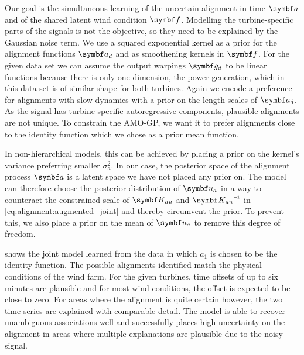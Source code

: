 Our goal is the simultaneous learning of the uncertain alignment in time $\rv{a}$ and of the shared latent wind condition $\rv{f}$.
Modelling the turbine-specific parts of the signals is not the objective, so they need to be explained by the Gaussian noise term.
We use a squared exponential kernel as a prior for the alignment functions $\rv{a_d}$ and as smoothening kernels in $\rv{f}$.
For the given data set we can assume the output warpings $\rv{g_d}$ to be linear functions because there is only one dimension, the power generation, which in this data set is of similar shape for both turbines.
Again we encode a preference for alignments with slow dynamics with a prior on the length scales of $\rv{a_d}$.
As the signal has turbine-specific autoregressive components, plausible alignments are not unique.
To constrain the AMO-GP, we want it to prefer alignments close to the identity function which we chose as a prior mean function.

In non-hierarchical models, this can be achieved by placing a prior on the kernel's variance preferring smaller $\sigma_a^2$.
In our case, the posterior space of the alignment process $\rv{a}$ is a latent space we have not placed any prior on.
The model can therefore choose the posterior distribution of $\rv{u_a}$ in a way to counteract the constrained scale of $\mat{K_{au}}$ and $\mat{K_{uu}}\inv$ in \cref{eq:alignment:augmented_joint} and thereby circumvent the prior.
To prevent this, we also place a prior on the mean of $\rv{u_a}$ to remove this degree of freedom.

 shows the joint model learned from the data in which $a_1$ is chosen to be the identity function.
The possible alignments identified match the physical conditions of the wind farm.
For the given turbines, time offsets of up to six minutes are plausible and for most wind conditions, the offset is expected to be close to zero.
For areas where the alignment is quite certain however, the two time series are explained with comparable detail.
The model is able to recover unambiguous associations well and successfully places high uncertainty on the alignment in areas where multiple explanations are plausible due to the noisy signal.

